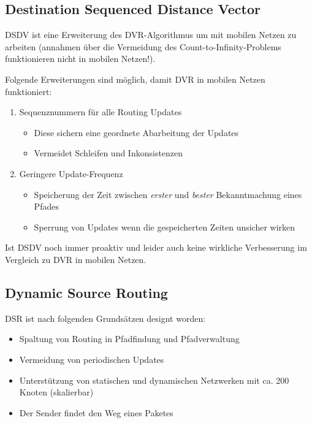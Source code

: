 \documentclass[a4paper, 11pt, accentcolor = tud3b]{tudreport}
\begin{document}
		    \subsection{Destination Sequenced Distance Vector}
			    DSDV ist eine Erweiterung des DVR-Algorithmus um mit mobilen Netzen zu arbeiten (annahmen über die Vermeidung des Count-to-Infinity-Problems funktionieren nicht in mobilen Netzen!).
			    
			    Folgende Erweiterungen sind möglich, damit DVR in mobilen Netzen funktioniert:
			    \begin{enumerate}
			    	\item Sequenznummern für alle Routing Updates
				    	\begin{itemize}
				    		\item Diese sichern eine geordnete Abarbeitung der Updates
				    		\item Vermeidet Schleifen und Inkonsistenzen
				    	\end{itemize}
			    	\item Geringere Update-Frequenz
				    	\begin{itemize}
				    		\item Speicherung der Zeit zwischen \textit{erster} und \textit{bester} Bekanntmachung eines Pfades
				    		\item Sperrung von Updates wenn die gespeicherten Zeiten unsicher wirken
				    	\end{itemize}
			    \end{enumerate}
			    
			    Ist DSDV noch immer proaktiv und leider auch keine wirkliche Verbesserung im Vergleich zu DVR in mobilen Netzen.
		    
		    \subsection{Dynamic Source Routing}
			    DSR ist nach folgenden Grundsätzen designt worden:
			    \begin{itemize}
			    	\item Spaltung von Routing in Pfadfindung und Pfadverwaltung
			    	\item Vermeidung von periodischen Updates
			    	\item Unterstützung von statischen und dynamischen Netzwerken mit ca. 200 Knoten (skalierbar)
			    	\item Der Sender findet den Weg eines Paketes
			    \end{itemize}
			    
\end{document}
